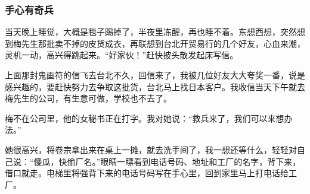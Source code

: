 \subsubsection*{手心有奇兵}
\par 当天晚上睡觉，大概是毯子踢掉了，半夜里冻醒，再也睡不着。东想西想，突然想到梅先生那批卖不掉的皮货成衣，再联想到台北开贸易行的几个好友，心血来潮，灵机一动，高兴得跳起来。“好家伙！”赶快披头散发起床写信。
\par 上面那封鬼画符的信飞去台北不久，回信来了，我被几位好友大大夸奖一番，说是感兴趣的，要赶快努力去争取这批货，台北马上找日本客户。我收信当天下午就去梅先生的公司，有生意可做，学校也不去了。
\par 梅不在公司里，他的女秘书正在打字。我对她说：“救兵来了，我们可以来想办法。”
\par 她很高兴，将卷宗拿出来在桌上一摊，就去洗手间了，我一想还等什么，轻轻对自己说：“傻瓜，快偷厂名。”眼睛一瞟看到电话号码、地址和工厂的名字，背下来，借口就走。电梯里将强背下来的电话号码写在手心里，回到家里马上打电话给工厂。
